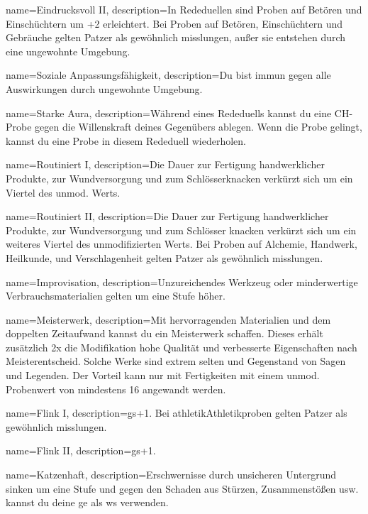 {
    name={Eindrucksvoll II},
    description={In Rededuellen sind Proben auf Betören und Einschüchtern um +2 erleichtert. Bei Proben auf Betören, Einschüchtern und Gebräuche gelten Patzer als gewöhnlich misslungen, außer sie entstehen durch eine ungewohnte Umgebung.}}

{
    name={Soziale Anpassungsfähigkeit},
    description={Du bist immun gegen alle Auswirkungen durch ungewohnte Umgebung.}}

{
    name={Starke Aura},
    description={Während eines Rededuells kannst du eine CH-Probe gegen die Willenskraft deines Gegenübers ablegen. Wenn die Probe gelingt, kannst du eine Probe in diesem Rededuell wiederholen.}}


{
    name={Routiniert I},
    description={Die Dauer zur Fertigung handwerklicher Produkte, zur Wundversorgung und zum Schlösserknacken verkürzt sich um ein Viertel des unmod. Werts.}}

{
    name={Routiniert II},
    description={Die Dauer zur Fertigung handwerklicher Produkte, zur Wundversorgung und zum Schlösser knacken verkürzt sich um ein weiteres Viertel des unmodifizierten Werts. Bei Proben auf Alchemie, Handwerk, Heilkunde, und Verschlagenheit gelten Patzer als gewöhnlich misslungen.}}

{
    name={Improvisation},
    description={Unzureichendes Werkzeug oder minderwertige
Verbrauchsmaterialien gelten um eine Stufe höher.}}

{
    name={Meisterwerk},
    description={Mit hervorragenden Materialien und dem doppelten Zeitaufwand kannst du ein Meisterwerk schaffen. Dieses erhält zusätzlich 2x die Modifikation hohe Qualität und verbesserte Eigenschaften nach Meisterentscheid. Solche Werke sind extrem selten und Gegenstand von Sagen und Legenden. Der Vorteil kann nur mit Fertigkeiten mit einem unmod. Probenwert von mindestens 16 angewandt werden.}}

{
    name={Flink I},
    description={\gls{gs}+1. Bei \gls{athletik}{Athletikproben} gelten Patzer als gewöhnlich misslungen.}}

{
    name={Flink II},
    description={\gls{gs}+1.}}

{
    name={Katzenhaft},
    description={Erschwernisse durch unsicheren Untergrund sinken um eine Stufe und gegen den Schaden aus Stürzen, Zusammenstößen usw. kannst du deine \gls{ge} als \gls{ws} verwenden.}}

